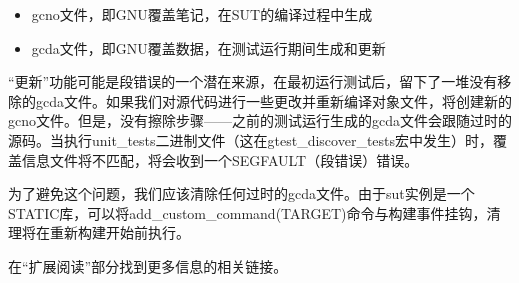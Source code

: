 \begin{itemize}
\item
gcno文件，即GNU覆盖笔记，在SUT的编译过程中生成

\item
gcda文件，即GNU覆盖数据，在测试运行期间生成和更新
\end{itemize}

“更新”功能可能是段错误的一个潜在来源，在最初运行测试后，留下了一堆没有移除的gcda文件。如果我们对源代码进行一些更改并重新编译对象文件，将创建新的gcno文件。但是，没有擦除步骤——之前的测试运行生成的gcda文件会跟随过时的源码。当执行unit\_tests二进制文件（这在gtest\_discover\_tests宏中发生）时，覆盖信息文件将不匹配，将会收到一个SEGFAULT（段错误）错误。

为了避免这个问题，我们应该清除任何过时的gcda文件。由于sut实例是一个STATIC库，可以将add\_custom\_command(TARGET)命令与构建事件挂钩，清理将在重新构建开始前执行。

在“扩展阅读”部分找到更多信息的相关链接。




